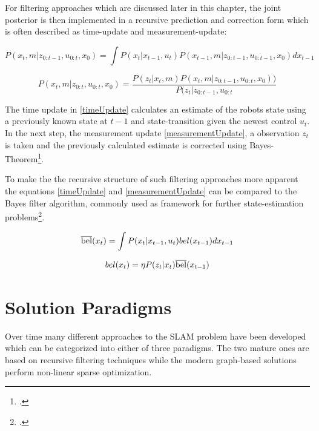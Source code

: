 
For filtering approaches which are discussed later in this chapter, the joint posterior is then implemented in a recursive prediction and correction form which is often described as time-update and measurement-update:

\begin{equation}\label{timeUpdate}
	P(x_{t}, m | z_{0:t-1}, u_{0:t}, x_{0}) = \int P(x_{t} | x_{t-1}, u_{t}) P(x_{t-1}, m | z_{0:t-1}, u_{0:t-1}, x_{0}) dx_{t-1}
\end{equation}


\begin{equation}\label{measurementUpdate}
	P(x_{t}, m | z_{0:t}, u_{0:t}, x_{0}) = \frac{P(z_{t} | x_{t}, m) P(x_{t}, m | z_{0:t-1}, u_{0:t}, x_{0}))}{P(z_{t} | z_{0:t-1}, u_{0:t}}
\end{equation}

The time update in \ref{timeUpdate} calculates an estimate of the robots state using a previously known state at $ t - 1 $ and state-transition given the newest control $ u_{t} $.
In the next step, the measurement update \ref{measurementUpdate}, a observation $z_{t} $ is taken and the previously calculated estimate is corrected using Bayes-Theorem\footcite{durrantSlam2006}. 

To make the the recursive structure of such filtering approaches more apparent the equations \ref{timeUpdate} and \ref{measurementUpdate} can be compared to the Bayes filter algorithm, commonly used as framework for further state-estimation problems\footcite[Page 23]{thrun2002probabilisticRobotics}.

\begin{equation}\label{timeUpdateBayes}
	\overline{\rm bel}(x_{t}) = \int P(x_{t} | x_{t-1}, u_{t})  bel(x_{t-1}) dx_{t-1}
\end{equation}


\begin{equation}\label{measurementUpdateBayes}
	bel(x_{t}) = \eta  P(z_{t} | x_{t})  \overline{\rm bel}(x_{t-1})
\end{equation}

\section{Solution Paradigms} 
Over time many different approaches to the SLAM problem have been developed which can be categorized into either of three paradigms. The two mature ones are based on recursive filtering techniques while the modern graph-based solutions perform non-linear sparse optimization.


